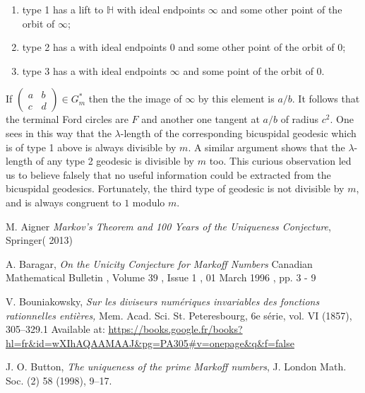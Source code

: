 \documentclass[12pt,a4paper]{amsart}
\def\HH{\mathbb{H}}
\def\GG{G_m}
\begin{document}
\begin{enumerate}
\item type 1 has a  lift to $\HH$ with ideal endpoints $\infty$ and some other point of the orbit of $\infty$;
\item type 2 has a with ideal endpoints $0$ and some other point of the orbit of $0$;
\item type 3 has a   with ideal endpoints $\infty$ and some point of the orbit of $0$.
\end{enumerate}

If $\begin{pmatrix} a & b \\ c & d \end{pmatrix} \in \GG^*$ then the the image
of $\infty$ by this element is $a/b$. It follows that the terminal Ford
circles are $F$ and another one tangent at $a/b$ of radius $c^2$. One sees in
this way that the $\lambda$-length of the corresponding bicuspidal geodesic
which is of type 1 above is always divisible by $m$. A similar argument shows
that the $\lambda$-length of any type 2 geodesic is divisible by $m$ too. This
curious observation led us to believe falsely that no useful information could
be extracted from the bicuspidal geodesics. Fortunately, the third type of
geodesic is not divisible by $m$, and is always congruent to $1$ modulo $m$.



M. Aigner
\textit{Markov's Theorem and 100 Years of the Uniqueness Conjecture}, Springer( 2013)


A. Baragar,
\textit{On the Unicity Conjecture for Markoff Numbers}
Canadian Mathematical Bulletin , Volume 39 , Issue 1 , 01 March 1996 , pp. 3 - 9

V. Bouniakowsky, 
\textit{Sur les diviseurs num\'eriques invariables des fonctions rationnelles enti\`eres,}
Mem. Acad. Sci. St. Peteresbourg, 6e s\'erie, vol. VI (1857), 305–329.1  \newline
Available at: \url{https://books.google.fr/books?hl=fr&id=wXIhAQAAMAAJ&pg=PA305#v=onepage&q&f=false}

J. O. Button, 
\textit{The uniqueness of the prime Markoff numbers},
 J. London Math. Soc.
(2) 58 (1998), 9–17.

\end{document}
